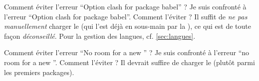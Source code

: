 \begin{dbfaq}{Comment éviter l'erreur \enquote{Option clash for package babel} ?}{}
  Je suis confronté à l'erreur \enquote{Option clash for package
    babel}. Comment l'éviter ?
  \tcblower
  Il suffit de \emph{ne pas manuellement} charger le  (qui l'est
  déjà en sous-main par la \yatcl{}), ce qui est de toute façon
  \emph{déconseillé}. Pour la gestion des langues, cf. \vref{sec:langues}.
\end{dbfaq}

\begin{dbfaq}{Comment éviter l'erreur \enquote{No room for a new
      \protect{}} ?}{}
  Je suis confronté à l'erreur \enquote{no room for a new
    }. Comment l'éviter ?
  \tcblower
  Il devrait suffire de charger le  (plutôt parmi les
  premiers packages).
\end{dbfaq}

%
\iffalse
\fi

